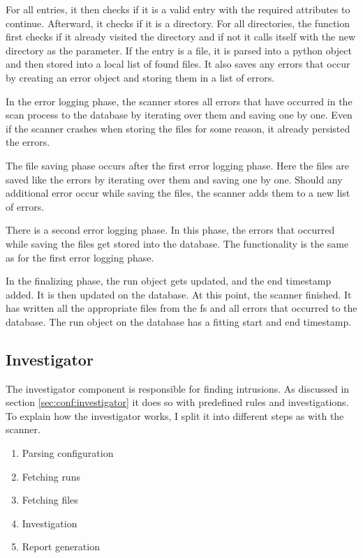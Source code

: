 For all entries, it then checks if it is a valid entry with the required attributes to continue. Afterward, it checks if it is a directory. For all directories, the function first checks if it already visited the directory and if not it calls itself with the new directory as the parameter. If the entry is a file, it is parsed into a python object and then stored into a local list of found files. It also saves any errors that occur by creating an error object and storing them in a list of errors.

In the error logging phase, the scanner stores all errors that have occurred in the scan process to the database by iterating over them and saving one by one. Even if the scanner crashes when storing the files for some reason, it already persisted the errors.

The file saving phase occurs after the first error logging phase. Here the files are saved like the errors by iterating over them and saving one by one. Should any additional error occur while saving the files, the scanner adds them to a new list of errors. 

There is a second error logging phase. In this phase, the errors that occurred while saving the files get stored into the database. The functionality is the same as for the first error logging phase.

In the finalizing phase, the run object gets updated, and the end timestamp added. It is then updated on the database. At this point, the scanner finished. It has written all the appropriate files from the \gls{fs} and all errors that occurred to the database. The run object on the database has a fitting start and end timestamp. 


\subsection{Investigator}
\label{sec:Investigator}

The investigator component is responsible for finding intrusions. As discussed in section \ref{sec:conf:investigator} it does so with predefined rules and investigations. To explain how the investigator works, I split it into different steps as with the scanner.

\begin{enumerate}
    \item Parsing configuration
    \item Fetching runs
    \item Fetching files
    \item Investigation
    \item Report generation
\end{enumerate}

